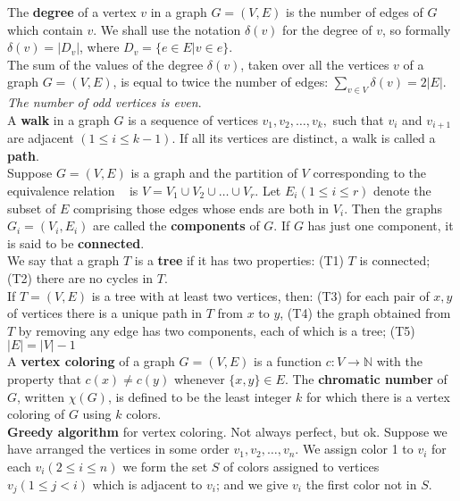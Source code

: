 \documentclass[10pt,landscape]{article}
\begin{document}
\begin{multicols}{4}
The \textbf{degree} of a vertex $v$ in a graph $G = (V,E)$ is the
number of edges of $G$ which contain $v$. We shall use the notation
$\delta(v)$ for the degree of $v$, so formally $\delta(v) = |D_{v}|$,
where $D_{v} = \{e \in E | v \in e \}$.\\

The sum of the values of the degree $\delta(v)$, taken over all the
vertices $v$ of a graph $G = (V,E)$, is equal to twice the number of
edges: $\displaystyle\sum_{v \in V} \delta(v) = 2|E|$.\\

\textit{The number of odd vertices is even}.\\

A \textbf{walk} in a graph $G$ is a sequence of vertices
$v_{1},v_{2},\dots , v_{k},$ such that $v_{i}$ and $v_{i+1}$ are
adjacent $(1 \leq i \leq k-1)$. If all its vertices are distinct, a
walk is called a \textbf{path}.\\

Suppose $G = (V,E)$ is a graph and the partition of $V$ corresponding
to the equivalence relation ~ is $V = V_{1} \cup V_{2} \cup \dots \cup
V_{r}$. Let $E_{i} (1 \leq i \leq r)$ denote the subset of $E$
comprising those edges whose ends are both in $V_{i}$. Then the graphs
$G_{i} = (V_{i}, E_{i})$ are called the \textbf{components} of $G$. If
$G$ has just one component, it is said to be \textbf{connected}.\\

We say that a graph $T$ is a \textbf{tree} if it has two properties:
(T1) $T$ is connected; (T2) there are no cycles in $T$.\\

If $T = (V,E)$ is a tree with at least two vertices, then: (T3) for
each pair of $x,y$ of vertices there is a unique path in $T$ from $x$
to $y$, (T4) the graph obtained from $T$ by removing any edge has two
components, each of which is a tree; (T5) $|E| = |V|-1$\\

A \textbf{vertex coloring} of a graph $G = (V,E)$ is a function $c: V
\to \mathbb{N}$ with the property that $c(x) \neq c(y)$ whenever
$\{x,y\} \in E$. The \textbf{chromatic number} of $G$, written
$\chi(G)$, is defined to be the least integer $k$ for which there is a
vertex coloring of $G$ using $k$ colors.\\

\textbf{Greedy algorithm} for vertex coloring. Not always perfect, but
ok. Suppose we have arranged the vertices in some order $v_{1}, v_{2},
\dots ,v_{n}$. We assign color 1 to $v_{i}$ for each $v_{i}(2 \leq i
\leq n)$ we form the set $S$ of colors assigned to vertices $v_{j}(1
\leq j < i)$ which is adjacent to $v_{i}$; and we give $v_{i}$ the
first color not in $S$.\\


\end{multicols}
\end{document}
